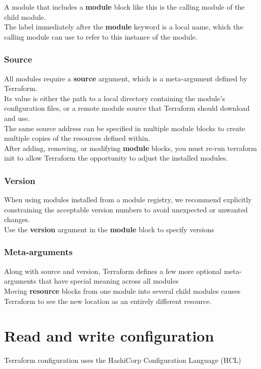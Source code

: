 \documentclass[12pt, letterpaper, twoside]{article}
\begin{document}
A module that includes a \textbf{module} block like this is the calling module of the child module.\\

The label immediately after the \textbf{module} keyword is a local name, which the calling module can use to refer 
to this instance of the module.

\subsubsection{Source}
All modules require a \textbf{source} argument, which is a meta-argument defined by Terraform.\\
Its value is either the path to a local directory containing the module's configuration files, or 
a remote module source that Terraform should download and use.\\

The same source address can be specified in multiple module blocks to create multiple copies of 
the resources defined within.\\

After adding, removing, or modifying \textbf{module} blocks, you must re-run terraform init to allow Terraform 
the opportunity to adjust the installed modules.

\subsubsection{Version}
When using modules installed from a module registry, we recommend explicitly constraining the acceptable version 
numbers to avoid unexpected or unwanted changes.\\

Use the \textbf{version} argument in the \textbf{module} block to specify versions\\

\subsubsection{Meta-arguments}
Along with source and version, Terraform defines a few more optional meta-arguments that have special meaning across 
all modules\\

Moving \textbf{resource} blocks from one module into several child modules causes Terraform to see the 
new location as an entirely different resource.\\

\section{Read and write configuration}
Terraform configuration uses the HashiCorp Configuration Language (HCL)\\
\end{document}
